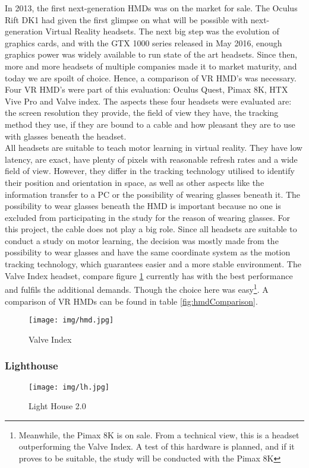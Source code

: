 In 2013, the first next-generation HMDs was on the market for sale. The Oculus Rift DK1 had given the first glimpse on what will be possible with next-generation Virtual Reality headsets. The next big step was the evolution of graphics cards, and with the GTX 1000 series released in May 2016, enough graphics power was widely available to run state of the art headsets. Since then, more and more headsets of multiple companies made it to market maturity, and today we are spoilt of choice. Hence, a comparison of VR HMD's was necessary. Four VR HMD's were part of this evaluation: Oculus Quest, Pimax 8K, HTX Vive Pro and Valve index. The aspects these four headsets were evaluated are: the screen resolution they provide, the field of view they have, the tracking method they use, if they are bound to a cable and how pleasant they are to use with glasses beneath the headset.\\
All headsets are suitable to teach motor learning in virtual reality. They have low latency, are exact, have plenty of pixels with reasonable refresh rates and a wide field of view. However, they differ in the tracking technology utilised to identify their position and orientation in space, as well as other aspects like the information transfer to a PC or the possibility of wearing glasses beneath it. The possibility to wear glasses beneath the HMD is important because no one is excluded from participating in the study for the reason of wearing glasses. For this project, the cable does not play a big role. Since all headsets are suitable to conduct a study on motor learning, the decision was mostly made from the possibility to wear glasses and have the same coordinate system as the motion tracking technology, which guarantees easier and a more stable environment. The Valve Index headset, compare figure \ref{fig:hmd} currently has with the best performance and fulfils the additional demands. Though the choice here was easy\footnote{Meanwhile, the Pimax 8K is on sale. From a technical view, this is a headset outperforming the Valve Index. A test of this hardware is planned, and if it proves to be suitable, the study will be conducted with the Pimax 8K}. A comparison of VR HMDs can be found in table \ref{fig:hmdComparison}.
\begin{figure}
	\centering
	\texttt{[image: img/hmd.jpg]}
	\caption{Valve Index}
	\label{fig:hmd}
\end{figure}


\subsubsection{Lighthouse}
\begin{figure}
	\centering
	\texttt{[image: img/lh.jpg]}
	\caption{Light House 2.0}
	\label{fig:lh}
\end{figure}


